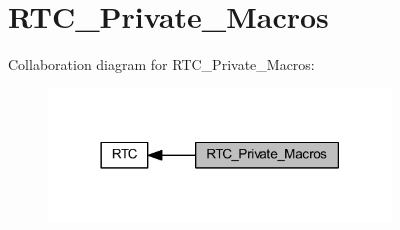 \hypertarget{group___r_t_c___private___macros}{}\section{R\+T\+C\+\_\+\+Private\+\_\+\+Macros}
\label{group___r_t_c___private___macros}
Collaboration diagram for R\+T\+C\+\_\+\+Private\+\_\+\+Macros\+:
\nopagebreak
\begin{figure}[H]
\begin{center}
\leavevmode
\includegraphics[width=258pt]{group___r_t_c___private___macros}
\end{center}
\end{figure}
